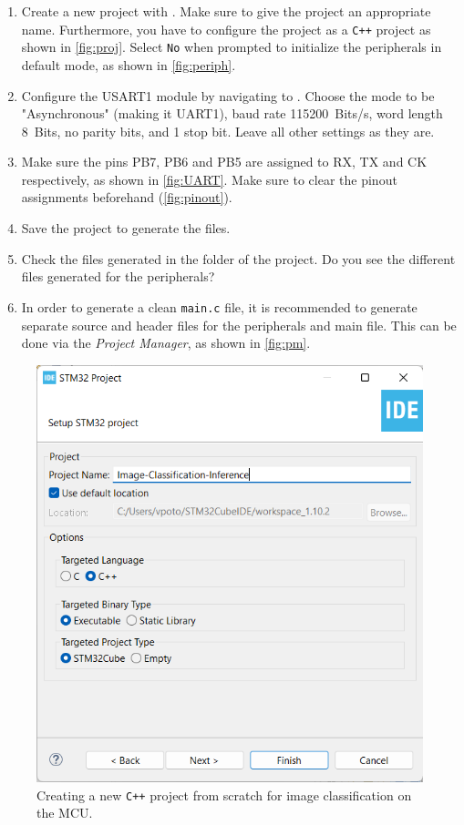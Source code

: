 \documentclass[parskip=half,notes,cadrem,toolver]{iisvlsi}
\begin{document}
\begin{studtask}
    \begin{enumerate}
        \item Create a new project with \stmcubeide. Make sure to give the project an appropriate name. Furthermore, you have to configure the project as a \texttt{C++} project as shown in \autoref{fig:proj}. Select \texttt{No} when prompted to initialize the peripherals in default mode, as shown in \autoref{fig:periph}.
        \item Configure the USART1 module by navigating to . Choose the mode to be "Asynchronous" (making it UART1), baud rate \SI{115200}{Bits/s}, word length \SI{8}{Bits}, no parity bits, and 1 stop bit. Leave all other settings as they are.
        \item Make sure the pins PB7, PB6 and PB5 are assigned to RX, TX and CK respectively, as shown in \autoref{fig:UART}. Make sure to clear the pinout assignments beforehand (\autoref{fig:pinout}). 
        \item Save the project to generate the files.
        \item Check the files generated in the  folder of the project. Do you see the different files generated for the peripherals?
        \item In order to generate a clean \texttt{main.c} file, it is recommended to generate separate source and header files for the peripherals and main file. This can be done via the \textit{Project Manager}, as shown in \autoref{fig:pm}.
    \end{enumerate}
\end{studtask}


\begin{figure}[H]
    \begin{center}
        \includegraphics[width=0.5\linewidth]{figures/image-classification.png}
        \caption{Creating a new \texttt{C++} \stmcubeide project from scratch for image classification on the MCU.}
        \label{fig:proj}
    \end{center}
\end{figure}
\end{document}
